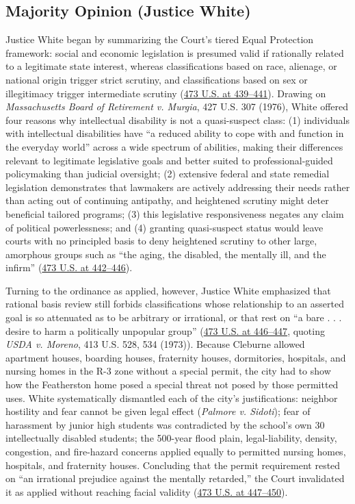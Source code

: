\documentclass[12pt]{article}
\begin{document}
\subsection{Majority Opinion (Justice White)}

Justice White began by summarizing the Court's tiered Equal Protection framework: social and economic legislation is presumed valid if rationally related to a legitimate state interest, whereas classifications based on race, alienage, or national origin trigger strict scrutiny, and classifications based on sex or illegitimacy trigger intermediate scrutiny (\href{https://supreme.justia.com/cases/federal/us/473/432/}{473 U.S. at 439--441}). Drawing on \textit{Massachusetts Board of Retirement v. Murgia}, 427 U.S. 307 (1976), White offered four reasons why intellectual disability is not a quasi-suspect class: (1) individuals with intellectual disabilities have ``a reduced ability to cope with and function in the everyday world'' across a wide spectrum of abilities, making their differences relevant to legitimate legislative goals and better suited to professional-guided policymaking than judicial oversight; (2) extensive federal and state remedial legislation demonstrates that lawmakers are actively addressing their needs rather than acting out of continuing antipathy, and heightened scrutiny might deter beneficial tailored programs; (3) this legislative responsiveness negates any claim of political powerlessness; and (4) granting quasi-suspect status would leave courts with no principled basis to deny heightened scrutiny to other large, amorphous groups such as ``the aging, the disabled, the mentally ill, and the infirm'' (\href{https://supreme.justia.com/cases/federal/us/473/432/}{473 U.S. at 442--446}).

Turning to the ordinance as applied, however, Justice White emphasized that rational basis review still forbids classifications whose relationship to an asserted goal is so attenuated as to be arbitrary or irrational, or that rest on ``a bare . . . desire to harm a politically unpopular group'' (\href{https://supreme.justia.com/cases/federal/us/473/432/}{473 U.S. at 446--447}, quoting \textit{USDA v. Moreno}, 413 U.S. 528, 534 (1973)). Because Cleburne allowed apartment houses, boarding houses, fraternity houses, dormitories, hospitals, and nursing homes in the R-3 zone without a special permit, the city had to show how the Featherston home posed a special threat not posed by those permitted uses. White systematically dismantled each of the city's justifications: neighbor hostility and fear cannot be given legal effect (\textit{Palmore v. Sidoti}); fear of harassment by junior high students was contradicted by the school's own 30 intellectually disabled students; the 500-year flood plain, legal-liability, density, congestion, and fire-hazard concerns applied equally to permitted nursing homes, hospitals, and fraternity houses. Concluding that the permit requirement rested on ``an irrational prejudice against the mentally retarded,'' the Court invalidated it as applied without reaching facial validity (\href{https://supreme.justia.com/cases/federal/us/473/432/}{473 U.S. at 447--450}).
\end{document}
